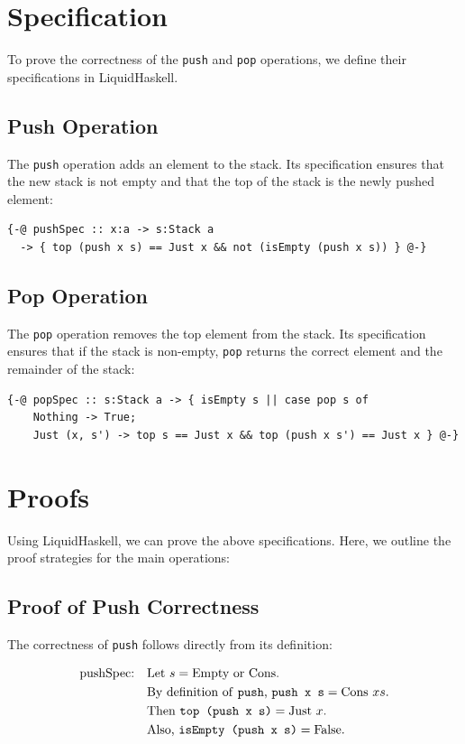 \documentclass[]{rptuseminar}
\begin{document}
\section{Specification}
To prove the correctness of the \texttt{push} and \texttt{pop} operations, we define their specifications in LiquidHaskell.

\subsection{Push Operation}
The \texttt{push} operation adds an element to the stack. Its specification ensures that the new stack is not empty and that the top of the stack is the newly pushed element:

\begin{lstlisting}[caption=Push Specification]
{-@ pushSpec :: x:a -> s:Stack a 
  -> { top (push x s) == Just x && not (isEmpty (push x s)) } @-}
\end{lstlisting}

\subsection{Pop Operation}
The \texttt{pop} operation removes the top element from the stack. Its specification ensures that if the stack is non-empty, \texttt{pop} returns the correct element and the remainder of the stack:

\begin{lstlisting}[caption=Pop Specification]
{-@ popSpec :: s:Stack a -> { isEmpty s || case pop s of
    Nothing -> True;
    Just (x, s') -> top s == Just x && top (push x s') == Just x } @-}
\end{lstlisting}

\section{Proofs}
Using LiquidHaskell, we can prove the above specifications. Here, we outline the proof strategies for the main operations:

\subsection{Proof of Push Correctness}
The correctness of \texttt{push} follows directly from its definition:

\begin{align*}
\text{pushSpec:} \quad & \text{Let } s = \text{Empty or Cons.} \\
& \text{By definition of \texttt{push}, } \texttt{push x s} = \text{Cons } x s. \\
& \text{Then } \texttt{top (push x s)} = \text{Just } x. \\
& \text{Also, } \texttt{isEmpty (push x s)} = \text{False.}
\end{align*}
\end{document}
